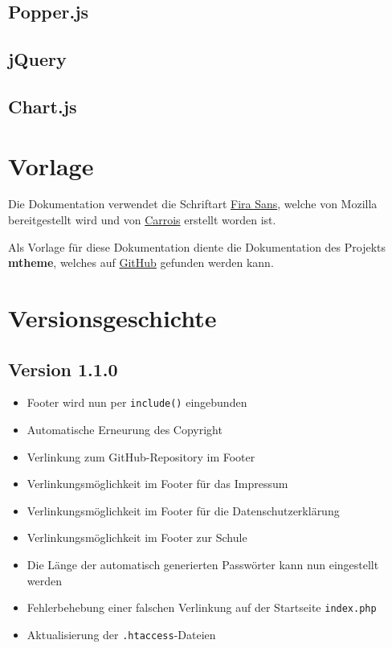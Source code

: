 \documentclass[ngerman]{ltxdoc}
\begin{document}


\subsection{Popper.js}



\subsection{jQuery}



\subsection{Chart.js}



\section{Vorlage}

Die Dokumentation verwendet die Schriftart
\href{https://www.mozilla.org/en-US/styleguide/products/firefox-os/typeface/}
{Fira Sans}, welche von Mozilla bereitgestellt wird und von
\href{http://www.carrois.com/fira-3-1/}{Carrois} erstellt worden ist.

Als Vorlage für diese Dokumentation diente die Dokumentation des Projekts \textbf{mtheme},
welches auf \href{https://github.com/matze/mtheme}{GitHub} gefunden werden kann.

\section{Versionsgeschichte}
\label{sec:ver}

\subsection*{Version 1.1.0}
\label{subsec:ver_1.1.0}

\begin{itemize}
  \item Footer wird nun per \verb+include()+ eingebunden
  \item Automatische Erneurung des Copyright
  \item Verlinkung zum GitHub-Repository im Footer
  \item Verlinkungsmöglichkeit im Footer für das Impressum
  \item Verlinkungsmöglichkeit im Footer für die Datenschutzerklärung
  \item Verlinkungsmöglichkeit im Footer zur Schule
  \item Die Länge der automatisch generierten Passwörter kann nun eingestellt werden
  \item Fehlerbehebung einer falschen Verlinkung auf der Startseite \verb+index.php+
  \item Aktualisierung der \verb+.htaccess+-Dateien
\end{itemize}
\end{document}
